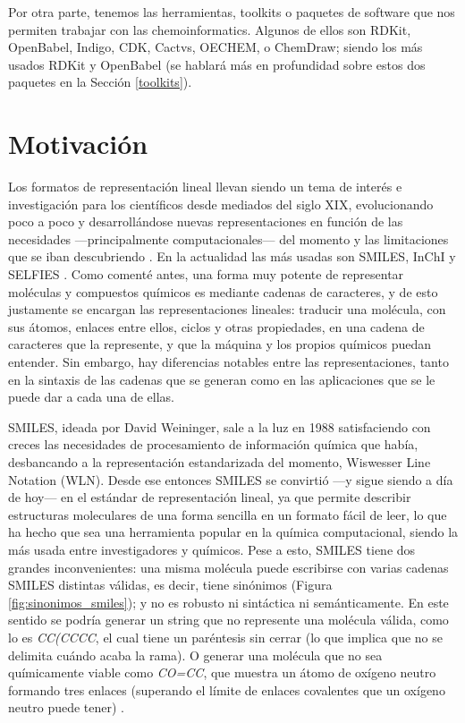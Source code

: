 Por otra parte, tenemos las herramientas, toolkits o paquetes de software que nos permiten trabajar con las chemoinformatics. Algunos de ellos son RDKit, OpenBabel, Indigo, CDK, Cactvs, OECHEM, o ChemDraw; siendo los más usados RDKit y OpenBabel (se hablará más en profundidad sobre estos dos paquetes en la Sección \ref{toolkits}).


\section{Motivación}\label{motivacion}

Los formatos de representación lineal llevan siendo un tema de interés e investigación para los científicos desde mediados del siglo XIX, evolucionando poco a poco y desarrollándose nuevas representaciones en función de las necesidades —principalmente computacionales— del momento y las limitaciones que se iban descubriendo \cite{107_years_linear_notations}. En la actualidad las más usadas son SMILES, InChI y SELFIES \cite{SELFIES}. Como comenté antes, una forma muy potente de representar moléculas y compuestos químicos es mediante cadenas de caracteres, y de esto justamente se encargan las representaciones lineales: traducir una molécula, con sus átomos, enlaces entre ellos, ciclos y otras propiedades, en una cadena de caracteres que la represente, y que la máquina y los propios químicos puedan entender. Sin embargo, hay diferencias notables entre las representaciones, tanto en la sintaxis de las cadenas que se generan como en las aplicaciones que se le puede dar a cada una de ellas.


SMILES, ideada por David Weininger, sale a la luz en 1988 satisfaciendo con creces las necesidades de procesamiento de información química que había, desbancando a la representación estandarizada del momento, Wiswesser Line Notation (WLN). Desde ese entonces SMILES se convirtió —y sigue siendo a día de hoy— en el estándar de representación lineal, ya que permite describir estructuras moleculares de una forma sencilla en un formato fácil de leer, lo que ha hecho que sea una herramienta popular en la química computacional, siendo la más usada entre investigadores y químicos. Pese a esto, SMILES tiene dos grandes inconvenientes: una misma molécula puede escribirse con varias cadenas SMILES distintas válidas, es decir, tiene sinónimos (Figura \ref{fig:sinonimos_smiles}); y no es robusto ni sintáctica ni semánticamente. En este sentido se podría generar un string que no represente una molécula válida, como lo es \emph{CC(CCCC}, el cual tiene un paréntesis sin cerrar (lo que implica que no se delimita cuándo acaba la rama). O generar una molécula que no sea químicamente viable como \emph{CO=CC}, que muestra un átomo de oxígeno neutro formando tres enlaces (superando el límite de enlaces covalentes que un oxígeno neutro puede tener) \cite{SELFIES}.

